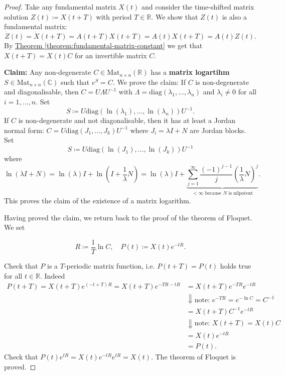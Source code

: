 \documentclass[hidelinks,a4paper, 11pt]{article}
\theoremstyle{plain}
\theoremstyle{break}
\theoremstyle{plain}
\theoremstyle{definition}
\begin{document}
{\begin{proof}
	Take any fundamental matrix $X(t)$ and consider the time-shifted matrix solution $Z(t) \coloneqq X(t+ T)$ with period $T \in \mathbb R$. We show that $Z(t)$ is also a fundamental matrix:
	\[
		\dot Z(t) = \dot X (t+T) = A(t+T)X(t+T) = A(t)X(t+T)= A(t)Z(t).
	\]
	By \hyperref[theorem:fundamental-matrix-constant]{Theorem \ref{theorem:fundamental-matrix-constant}} we get that $X(t+T) = X(t) C$ for an invertible matrix $C$.
	
	\textbf{Claim:} Any non-degenerate $C \in \mathrm{Mat}_{n \times n}(\mathbb R)$ has a \textbf{matrix logartihm} $S \in \mathrm{Mat}_{n \times n}(\mathbb C)$ such that $e^S = C$. We prove the claim: If $C$ is non-degenerate and diagonalisable, then $C = U \Lambda U^{-1}$ with $\Lambda = \mathrm{diag}(\lambda_1,...,\lambda_n)$ and $\lambda_i \neq 0$ for all $i=1,...,n$. Set 
	\[
		S \coloneqq U \mathrm{diag}(\ln(\lambda_1), ..., \ln(\lambda_n))U^{-1}.
	\] 
	If $C$ is non-degenerate and not diagonalisable, then it has at least a Jordan normal form: $C = U\mathrm{diag}(J_1,...,J_k)U^{-1}$ where $J_i = \lambda I + N$ are Jordan blocks. Set
	\[
		S \coloneqq U \mathrm{diag}(\ln(J_1),...,\ln(J_k)) U^{-1}
	\]
	where
	\[
		\ln(\lambda I + N) = \ln(\lambda)I + \ln(I + \frac{1}{\lambda}N) = \ln(\lambda) I +\underbrace{ \sum^{\infty}_{j=1}\frac{(-1)^{j-1}}{j}(\frac{1}{\lambda}N)^j}_{< \infty \text{ because $N$ is nilpotent}}.
	\]
	This proves the claim of the existence of a matrix logarithm.
	
	Having proved the claim, we return back to the proof of the theorem of Floquet. We set
	\begin{framed}
	\[
		R \coloneqq \frac{1}{T}\ln C, \quad P(t) \coloneqq X(t)e^{-tR}.
	\]
	\end{framed}
	Check that $P$ is a $T$-periodic matrix function, i.e. $P(t+T) = P(t)$ holds true for all $t \in \mathbb R$. Indeed 
	\begin{align*}
		P(t+T) = X(t+T)e^{(-t+T)R} = X(t+T)e^{-TR-tR} &= X(t+T)e^{-TR}e^{-tR} \\
		&\Downarrow \text{note: $e^{-TR} = e^{-\ln C} = C^{-1}$}\\
		&= X(t+T)C^{-1}e^{-tR}\\
		&\Downarrow \text{note: $X(t+T)=X(t)C$}\\
		&= X(t)e^{-tR} \\
		&= P(t).
	\end{align*}
	Check that $P(t)e^{tR} = X(t)e^{-tR}e^{tR} = X(t)$. The theorem of Floquet is proved.
\end{proof}

}
\end{document}
